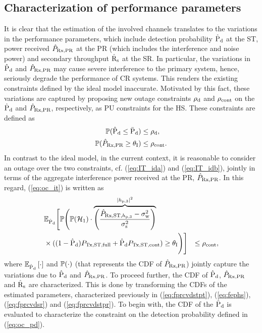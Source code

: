 \subsection{Characterization of performance parameters}
It is clear that the estimation of the involved channels translates to the variations in the performance parameters, which include detection probability $\hat{\text{P}}_{\text{d}}$ at the ST, power received $\hat{P}_{\text{Rx,PR}}$ at the PR (which includes the interference and noise power) and secondary throughput $\hat{\text{{R}}}_{\text{s}}$ at the SR. In particular, the variations in $\hat{\text{P}}_{\text{d}}$ and $\hat{P}_{\text{Rx,PR}}$ may cause severe interference to the primary system, hence, seriously degrade the performance of CR systems. This renders the existing constraints defined by the ideal model inaccurate. 
Motivated by this fact, these variations are captured by proposing new outage constraints $\rho_{\text{d}}$ and $\rho_{\text{cont}}$ on the $\hat{\text{P}}_{\text{d}}$ and $\hat{P}_{\text{Rx,PR}}$, respectively, as PU constraints for the HS. These constraints are defined as  
\begin{align}
\mathbb P(\hat{\text{P}}_{\text{d}} \le \bar{\text{P}}_{\text{d}}) &\le \rho_{\text{d}} \label{eq:oc_pd}, \\
\mathbb P(\hat{P}_{\text{Rx,PR}} \ge \theta_{\text{I}}) &\le \rho_{\text{cont}} \label{eq:oc_it}.
\end{align}   
In contrast to the ideal model, in the current context, it is reasonable to consider an outage over the two constraints, cf. (\ref{eq:IT_ida}) and (\ref{eq:IT_idb}), jointly in terms of the aggregate interference power received at the PR, $\hat{P}_{\text{Rx,PR}}$. In this regard, (\ref{eq:oc_it}) is written as 
\begin{align}
& \mathbb{E}_{\hat{\text{P}}_{\text{d}}} \Bigg[ \mathbb P \Bigg( \mathbb P(\mathcal{H}_1) \cdot \smash[b]{\overbrace{\left( \frac{\hat{P}_{\text{Rx,ST,$h_{\text{p,3}}$}} - \sigma^2_{\text{w}}}{\sigma^2_{\text{s}}} \right)}^{|h_{\text{p,3}}|^2}} \nonumber \\ & \times ((1 - \hat{\text{P}}_{\text{d}}) P_{\text{Tx,ST,full}} + \hat{\text{P}}_{\text{d}} P_{\text{Tx,ST,cont}}) \ge \theta_{\text{I}} \Bigg) \Bigg] &\le \rho_{\text{cont}} \label{eq:oc_it_def}, 
\end{align}
where ${\mathbb E}_{\hat{\text{P}}_{\text{d}}}\left[ \cdot \right]$ and $\mathbb P(\cdot)$ (that represents the CDF of $\hat{P}_{\text{Rx,PR}}$) jointly capture the variations due to $\hat{\text{P}}_{\text{d}}$ and $\hat{P}_{\text{Rx,PR}}$. 
To proceed further, the CDF of $\hat{\text{P}}_{\text{d}}$, $\hat{P}_{\text{Rx,PR}}$ and $\hat{\text{{R}}}_{\text{s}}$ are characterized. This is done by transforming the CDFs of the estimated parameters, characterized previously in (\ref{eq:fprcvdstpt}), (\ref{eq:fephs}), (\ref{eq:fprcvdsr}) and (\ref{eq:fprcvdstpr}). To begin with, the CDF of the $\hat{\text{P}}_{\text{d}}$ is evaluated to characterize the constraint on the detection probability defined in (\ref{eq:oc_pd}). 
